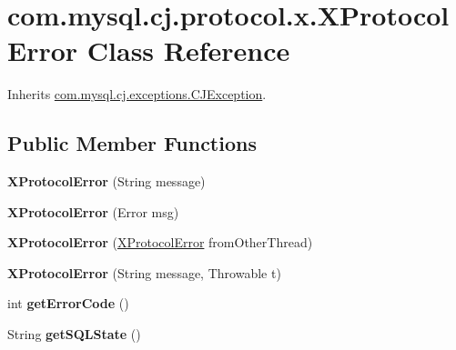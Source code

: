 \hypertarget{classcom_1_1mysql_1_1cj_1_1protocol_1_1x_1_1_x_protocol_error}{}\section{com.\+mysql.\+cj.\+protocol.\+x.\+X\+Protocol\+Error Class Reference}
\label{classcom_1_1mysql_1_1cj_1_1protocol_1_1x_1_1_x_protocol_error}


Inherits \mbox{\hyperlink{classcom_1_1mysql_1_1cj_1_1exceptions_1_1_c_j_exception}{com.\+mysql.\+cj.\+exceptions.\+C\+J\+Exception}}.

\subsection*{Public Member Functions}
\begin{DoxyCompactItemize}
\item 
\mbox{\label{classcom_1_1mysql_1_1cj_1_1protocol_1_1x_1_1_x_protocol_error_a6a94dd1bcf4c6d2796ef140c615dcaec}} 
{\bfseries X\+Protocol\+Error} (String message)
\item 
\mbox{\label{classcom_1_1mysql_1_1cj_1_1protocol_1_1x_1_1_x_protocol_error_a3bca6e42191ea9e9a0b983355bda021a}} 
{\bfseries X\+Protocol\+Error} (Error msg)
\item 
\mbox{\label{classcom_1_1mysql_1_1cj_1_1protocol_1_1x_1_1_x_protocol_error_aeabd60ded1eb305b92aee8e080d72fbc}} 
{\bfseries X\+Protocol\+Error} (\mbox{\hyperlink{classcom_1_1mysql_1_1cj_1_1protocol_1_1x_1_1_x_protocol_error}{X\+Protocol\+Error}} from\+Other\+Thread)
\item 
\mbox{\label{classcom_1_1mysql_1_1cj_1_1protocol_1_1x_1_1_x_protocol_error_ac4646bf4e168d9f7771831a34d0cc7e8}} 
{\bfseries X\+Protocol\+Error} (String message, Throwable t)
\item 
\mbox{\label{classcom_1_1mysql_1_1cj_1_1protocol_1_1x_1_1_x_protocol_error_a04bb16e710d0137a5290294a1590761b}} 
int {\bfseries get\+Error\+Code} ()
\item 
\mbox{\label{classcom_1_1mysql_1_1cj_1_1protocol_1_1x_1_1_x_protocol_error_acdfdb965cbedd939659a20d73c525ccf}} 
String {\bfseries get\+S\+Q\+L\+State} ()
\end{DoxyCompactItemize}

